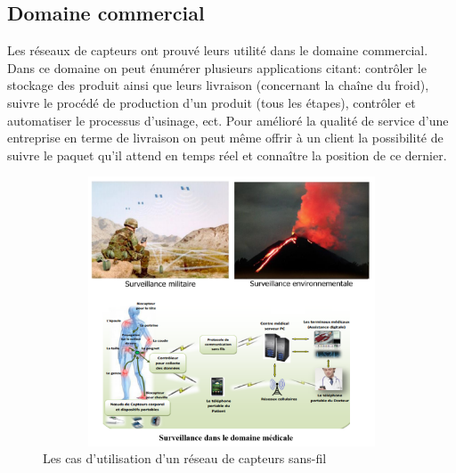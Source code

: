 \subsection{Domaine commercial}
Les réseaux de capteurs ont prouvé leurs utilité dans le domaine commercial. Dans ce 	domaine on peut énumérer plusieurs applications citant: contrôler le stockage des produit 	ainsi que leurs livraison (concernant la chaîne du froid), suivre le procédé de production 	d’un produit (tous les étapes), contrôler et automatiser le processus d’usinage, ect. Pour 	amélioré la qualité de service d’une entreprise en terme de livraison on peut même offrir à 	un client la possibilité de suivre le  paquet qu’il attend en temps réel et connaître la position 	de ce dernier.

\begin{figure}[H]
	\centering
	\includegraphics[width=14cm,height=8cm]{Chap1/7.png}
	\caption{Les cas d’utilisation d’un réseau de capteurs sans-fil}
	\label{fig:CURCSF}
\end{figure}



